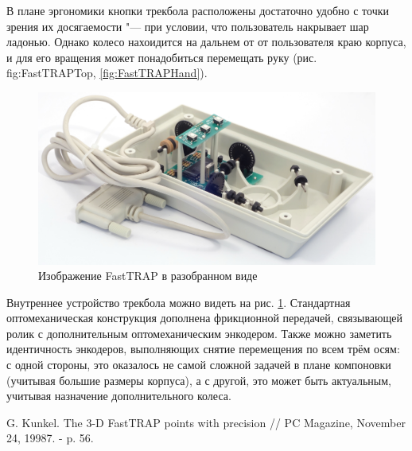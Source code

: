 \documentclass[11pt, a4paper]{article}
\begin{document}
В плане эргономики кнопки трекбола расположены достаточно удобно с точки зрения их досягаемости "--- при условии, что пользователь накрывает шар ладонью. Однако колесо нахоидится на дальнем от от пользователя краю корпуса, и для его вращения может понадобиться перемещать руку (рис. {fig:FastTRAPTop}, \ref{fig:FastTRAPHand}).


\begin{figure}[h]
    \centering
    \includegraphics[scale=0.5]{1987_microspeed_fasttrap/inside_15.jpg}
    \caption{Изображение FastTRAP в разобранном виде}
    \label{fig:FastTRAPInside}
\end{figure}

Внутреннее устройство трекбола можно видеть на рис. \ref{fig:FastTRAPInside}.
Стандартная оптомеханическая конструкция дополнена фрикционной передачей, связывающей ролик с дополнительным оптомеханическим энкодером. Также можно заметить идентичность энкодеров, выполняющих снятие перемещения по всем трём осям: с одной стороны, это оказалось не самой сложной задачей в плане компоновки (учитывая большие размеры корпуса), а с другой, это может быть актуальным, учитывая назначение дополнительного колеса.

\begin{thebibliography}{9}
 G. Kunkel. The 3-D FastTRAP points with precision // PC Magazine, November 24, 19987. - p. 56.
\end{thebibliography}
\end{document}

